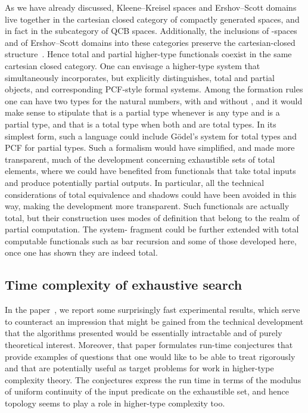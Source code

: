 \documentclass{LMCS}
\begin{document}
As we have already discussed, Kleene--Kreisel spaces and Ershov--Scott
domains live together in the cartesian closed category of compactly
generated spaces, and in fact in the subcategory of QCB spaces.
Additionally, the inclusions of -spaces and of Ershov--Scott
domains into these categories preserve the cartesian-closed
structure~\cite{escardo:lawson:simpson,MR2328287}.  Hence total and
partial higher-type functionals coexist in the same cartesian closed
category.  One can envisage a higher-type system that simultaneously
incorporates, but explicitly distinguishes, total and partial objects,
and corresponding PCF-style formal systems. Among the formation rules
one can have two types for the natural numbers, with and without
, and it would make sense to stipulate that  is
a partial type whenever  is any type and  is a partial
type, and that  is a total type when both 
and  are total types. In its simplest form, such a language
could include G\"odel's system  for total types and PCF for partial
types. Such a formalism would have simplified, and made more
transparent, much of the development concerning exhaustible sets of
total elements, where we could have benefited from functionals that
take total inputs and produce potentially partial outputs.  In
particular, all the technical considerations of total equivalence and
shadows could have been avoided in this way, making the development
more transparent. Such functionals are actually total, but their
construction uses modes of definition that belong to the realm of
partial computation. The system- fragment could be further extended
with total computable functionals such as bar recursion and some of
those developed here, once one has shown they are indeed total.

\subsection{Time complexity of exhaustive search}

In the paper~\cite{escardo:lics07}, we report some surprisingly fast
experimental results, which serve to counteract an impression that
might be gained from the technical development that the algorithms
presented would be essentially intractable and of purely theoretical
interest. Moreover, that paper formulates run-time conjectures that
provide examples of questions that one would like to be able to treat
rigorously and that are potentially useful as target problems for work
in higher-type complexity theory.  The conjectures express the run
time in terms of the modulus of uniform continuity of the input
predicate on the exhaustible set, and hence topology seems to play a
role in higher-type complexity too.
\end{document}
